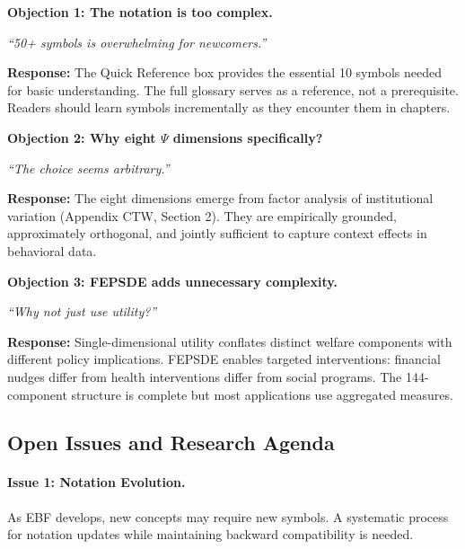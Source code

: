 \begin{tcolorbox}[colback=red!5!white, colframe=red!75!black,
    title=\textbf{Critical Foundations: Objections and Responses}]

\textbf{Objection 1: The notation is too complex.}

\textit{``50+ symbols is overwhelming for newcomers.''}

\textbf{Response:} The Quick Reference box provides the essential 10 symbols needed
for basic understanding. The full glossary serves as a reference, not a prerequisite.
Readers should learn symbols incrementally as they encounter them in chapters.

\medskip

\textbf{Objection 2: Why eight $\Psi$ dimensions specifically?}

\textit{``The choice seems arbitrary.''}

\textbf{Response:} The eight dimensions emerge from factor analysis of institutional
variation (Appendix CTW, Section 2). They are empirically grounded, approximately
orthogonal, and jointly sufficient to capture context effects in behavioral data.

\medskip

\textbf{Objection 3: FEPSDE adds unnecessary complexity.}

\textit{``Why not just use utility?''}

\textbf{Response:} Single-dimensional utility conflates distinct welfare components
with different policy implications. FEPSDE enables targeted interventions: financial
nudges differ from health interventions differ from social programs. The 144-component
structure is complete but most applications use aggregated measures.

\end{tcolorbox}


\subsection{Open Issues and Research Agenda}
\label{sec:glossary-openissues}

\paragraph{Issue 1: Notation Evolution.}
As EBF develops, new concepts may require new symbols. A systematic process
for notation updates while maintaining backward compatibility is needed.

